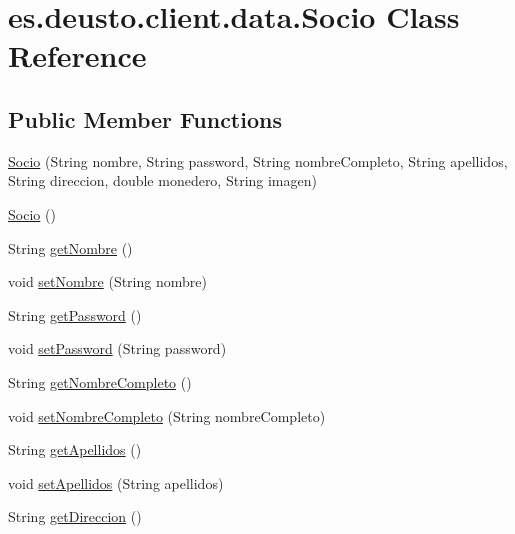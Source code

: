 \hypertarget{classes_1_1deusto_1_1client_1_1data_1_1_socio}{}\section{es.\+deusto.\+client.\+data.\+Socio Class Reference}
\label{classes_1_1deusto_1_1client_1_1data_1_1_socio}
\subsection*{Public Member Functions}
\begin{DoxyCompactItemize}
\item 
\mbox{\hyperlink{classes_1_1deusto_1_1client_1_1data_1_1_socio_a2a27cfa518429e9d25899ddaf1ab7ea7}{Socio}} (String nombre, String password, String nombre\+Completo, String apellidos, String direccion, double monedero, String imagen)
\item 
\mbox{\hyperlink{classes_1_1deusto_1_1client_1_1data_1_1_socio_afc3a227c9275ef5622c8b80106ed76a2}{Socio}} ()
\item 
String \mbox{\hyperlink{classes_1_1deusto_1_1client_1_1data_1_1_socio_abf7b3866357ef5c0f19317d745c0d9bc}{get\+Nombre}} ()
\item 
void \mbox{\hyperlink{classes_1_1deusto_1_1client_1_1data_1_1_socio_adbbc7a12f87235dc339a43cfe286e185}{set\+Nombre}} (String nombre)
\item 
String \mbox{\hyperlink{classes_1_1deusto_1_1client_1_1data_1_1_socio_a7916f4ed896d0df09332a9538eb469ef}{get\+Password}} ()
\item 
void \mbox{\hyperlink{classes_1_1deusto_1_1client_1_1data_1_1_socio_ae4df4a83361472df8ac0c6a4494be475}{set\+Password}} (String password)
\item 
String \mbox{\hyperlink{classes_1_1deusto_1_1client_1_1data_1_1_socio_a7799fe265940b5b5296c0b998e62798d}{get\+Nombre\+Completo}} ()
\item 
void \mbox{\hyperlink{classes_1_1deusto_1_1client_1_1data_1_1_socio_ac469151896eaa089ff0a3380eb1d410c}{set\+Nombre\+Completo}} (String nombre\+Completo)
\item 
String \mbox{\hyperlink{classes_1_1deusto_1_1client_1_1data_1_1_socio_a22bcd81f03f7349b71b40aef1e350b27}{get\+Apellidos}} ()
\item 
void \mbox{\hyperlink{classes_1_1deusto_1_1client_1_1data_1_1_socio_afff71fd05a69817bc4ca7b672f7bff52}{set\+Apellidos}} (String apellidos)
\item 
String \mbox{\hyperlink{classes_1_1deusto_1_1client_1_1data_1_1_socio_a0d42844a1e3563fca08c7caa663f0e1f}{get\+Direccion}} ()

\end{DoxyCompactItemize}
